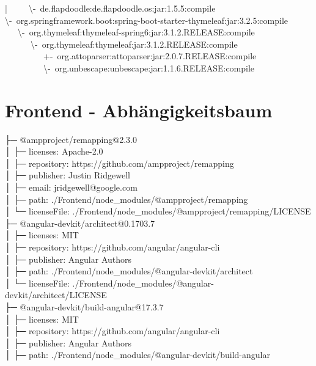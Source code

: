 \documentclass[
    paper=a4,
    twoside=false,
    parskip=half,
    listof=entryprefix,
    listof=totoc,
    index=totoc,
    bibliography=totoc,
    headsepline,
]{scrbook}
\begin{document}
    |~~~~~\textbackslash-~de.flapdoodle:de.flapdoodle.os:jar:1.5.5:compile\\
    \textbackslash-~org.springframework.boot:spring-boot-starter-thymeleaf:jar:3.2.5:compile\\
    ~~~\textbackslash-~org.thymeleaf:thymeleaf-spring6:jar:3.1.2.RELEASE:compile\\
    ~~~~~~\textbackslash-~org.thymeleaf:thymeleaf:jar:3.1.2.RELEASE:compile\\
    ~~~~~~~~~+-~org.attoparser:attoparser:jar:2.0.7.RELEASE:compile\\
    ~~~~~~~~~\textbackslash-~org.unbescape:unbescape:jar:1.1.6.RELEASE:compile\\

    \section{Frontend - Abhängigkeitsbaum}\label{sec:frontend---abhangigkeitsbaum}
    ├─ @ampproject/remapping@2.3.0\\
    │  ├─ licenses: Apache-2.0\\
    │  ├─ repository: https://github.com/ampproject/remapping\\
    │  ├─ publisher: Justin Ridgewell\\
    │  ├─ email: jridgewell@google.com\\
    │  ├─ path: ./Frontend/node\_modules/@ampproject/remapping\\
    │  └─ licenseFile: ./Frontend/node\_modules/@ampproject/remapping/LICENSE\\
    ├─ @angular-devkit/architect@0.1703.7\\
    │  ├─ licenses: MIT\\
    │  ├─ repository: https://github.com/angular/angular-cli\\
    │  ├─ publisher: Angular Authors\\
    │  ├─ path: ./Frontend/node\_modules/@angular-devkit/architect\\
    │  └─ licenseFile: ./Frontend/node\_modules/@angular-devkit/architect/LICENSE\\
    ├─ @angular-devkit/build-angular@17.3.7\\
    │  ├─ licenses: MIT\\
    │  ├─ repository: https://github.com/angular/angular-cli\\
    │  ├─ publisher: Angular Authors\\
    │  ├─ path: ./Frontend/node\_modules/@angular-devkit/build-angular\\
\end{document}
